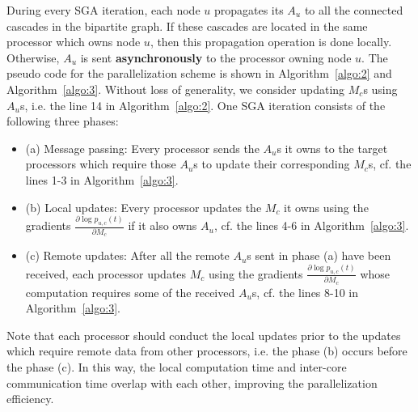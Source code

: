 During every SGA iteration, each node $u$ propagates its $A_u$ to all the connected cascades in the bipartite graph. If these cascades are located in the same processor which owns node $u$, then this propagation operation is done locally. Otherwise, $A_u$ is sent \textbf{asynchronously} to the processor owning node $u$. The pseudo code for the parallelization scheme is shown in Algorithm~\ref{algo:2} and Algorithm~\ref{algo:3}. Without loss of generality, we consider updating $M_c$s using $A_u$s, i.e. the line 14 in Algorithm~\ref{algo:2}. One SGA iteration consists of the following three phases:
\begin{itemize}
\item (a) Message passing: Every processor sends the $A_u$s it owns to the target processors which require those $A_u$s to update their corresponding $M_c$s, cf. the lines 1-3 in Algorithm~\ref{algo:3}.
\item (b) Local updates: Every processor updates the $M_c$ it owns using the gradients $\frac{\partial \log p_{u,c}(t) }{\partial M_{c}}$ if it also owns $A_u$, cf. the lines 4-6 in Algorithm~\ref{algo:3}. 
\item (c) Remote updates: After all the remote $A_u$s sent in phase (a) have been received, each processor updates $M_c$ using the gradients $\frac{\partial \log p_{u,c}(t) }{\partial M_{c}}$ whose computation requires some of the received $A_u$s, cf. the lines 8-10 in Algorithm~\ref{algo:3}.
\end{itemize}
Note that each processor should conduct the local updates prior to the updates which require remote data from other processors, i.e. the phase (b) occurs before the phase (c). In this way, the local computation time and inter-core communication time overlap with each other, improving the parallelization efficiency. 

